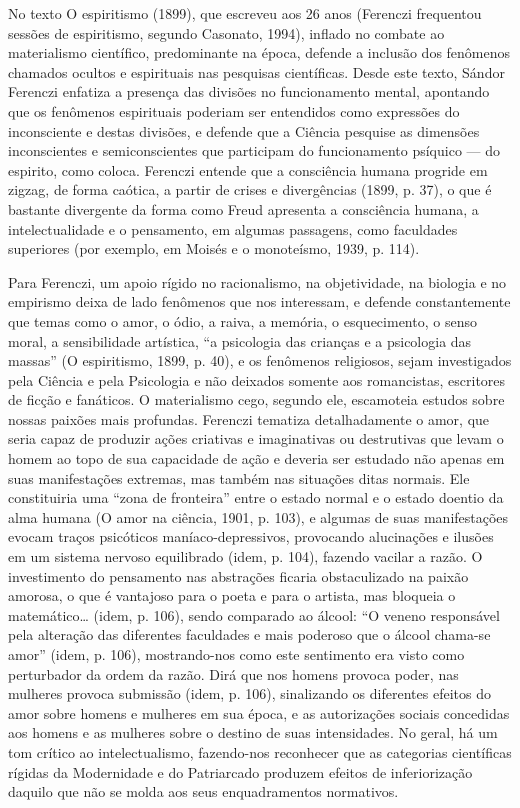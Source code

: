 No texto O espiritismo (1899), que escreveu aos 26 anos (Ferenczi
frequentou sessões de espiritismo, segundo Casonato, 1994), inflado no
combate ao materialismo científico, predominante na época, defende a
inclusão dos fenômenos chamados ocultos e espirituais nas pesquisas
científicas. Desde este texto, Sándor Ferenczi enfatiza a presença das
divisões no funcionamento mental, apontando que os fenômenos espirituais
poderiam ser entendidos como expressões do inconsciente e destas
divisões, e defende que a Ciência pesquise as dimensões inconscientes e
semiconscientes que participam do funcionamento psíquico --- do espirito,
como coloca. Ferenczi entende que a consciência humana progride em
zigzag, de forma caótica, a partir de crises e divergências (1899, p.
37), o que é bastante divergente da forma como Freud apresenta a
consciência humana, a intelectualidade e o pensamento, em algumas
passagens, como faculdades superiores (por exemplo, em Moisés e o
monoteísmo, 1939, p. 114).

Para Ferenczi, um apoio rígido no racionalismo, na objetividade, na
biologia e no empirismo deixa de lado fenômenos que nos interessam, e
defende constantemente que temas como o amor, o ódio, a raiva, a
memória, o esquecimento, o senso moral, a sensibilidade artística, ``a
psicologia das crianças e a psicologia das massas'' (O espiritismo,
1899, p. 40), e os fenômenos religiosos, sejam investigados pela Ciência
e pela Psicologia e não deixados somente aos romancistas, escritores de
ficção e fanáticos. O materialismo cego, segundo ele, escamoteia estudos
sobre nossas paixões mais profundas. Ferenczi tematiza detalhadamente o
amor, que seria capaz de produzir ações criativas e imaginativas ou
destrutivas que levam o homem ao topo de sua capacidade de ação e
deveria ser estudado não apenas em suas manifestações extremas, mas
também nas situações ditas normais. Ele constituiria uma ``zona de
fronteira'' entre o estado normal e o estado doentio da alma humana (O
amor na ciência, 1901, p. 103), e algumas de suas manifestações evocam
traços psicóticos maníaco-depressivos, provocando alucinações e ilusões
em um sistema nervoso equilibrado (idem, p. 104), fazendo vacilar a
razão. O investimento do pensamento nas abstrações ficaria obstaculizado
na paixão amorosa, o que é vantajoso para o poeta e para o artista, mas
bloqueia o matemático\ldots{} (idem, p. 106), sendo comparado ao álcool: ``O
veneno responsável pela alteração das diferentes faculdades e mais
poderoso que o álcool chama-se amor'' (idem, p. 106), mostrando-nos como
este sentimento era visto como perturbador da ordem da razão. Dirá que
nos homens provoca poder, nas mulheres provoca submissão (idem, p. 106),
sinalizando os diferentes efeitos do amor sobre homens e mulheres em sua
época, e as autorizações sociais concedidas aos homens e as mulheres
sobre o destino de suas intensidades. No geral, há um tom crítico ao
intelectualismo, fazendo-nos reconhecer que as categorias científicas
rígidas da Modernidade e do Patriarcado produzem efeitos de
inferiorização daquilo que não se molda aos seus enquadramentos
normativos.

